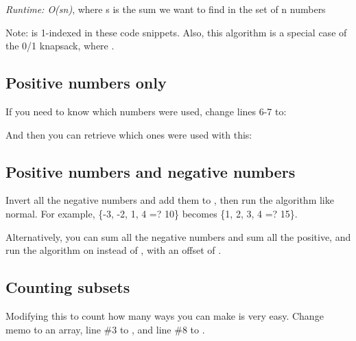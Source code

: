 
\textit{Runtime: O(sn)}, where s is the sum we want to find in the set of n numbers

Note:  is 1-indexed in these code snippets. Also, this algorithm is a special case of the 0/1 knapsack, where .

\subsection*{Positive numbers only}



If you need to know which numbers were used, change lines 6-7 to:



And then you can retrieve which ones were used with this:



\subsection*{Positive numbers and negative numbers}

Invert all the negative numbers and add them to , then run the algorithm like normal. For example, \{-3, -2, 1, 4 =? 10\} becomes \{1, 2, 3, 4 =? 15\}.

Alternatively, you can sum all the negative numbers and sum all the positive, and run the algorithm on  instead of \inline{[0, target]}, with an offset of .

\subsection*{Counting subsets}

Modifying this to count how many ways you can make  is very easy. Change memo to an  array, line \#3 to , and line \#8 to \inline{+=}. 

\newpage
